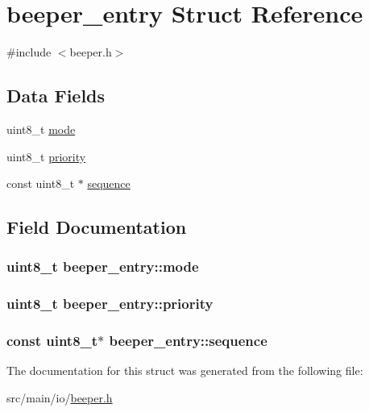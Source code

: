 \hypertarget{structbeeper__entry}{\section{beeper\+\_\+entry Struct Reference}
\label{structbeeper__entry}
}


{\ttfamily \#include $<$beeper.\+h$>$}

\subsection*{Data Fields}
\begin{DoxyCompactItemize}
\item 
uint8\+\_\+t \hyperlink{structbeeper__entry_a740cb9eaead3edd596b8ffcfae78cf38}{mode}
\item 
uint8\+\_\+t \hyperlink{structbeeper__entry_a863a198fa1ebd40f855fcc742ab92fba}{priority}
\item 
const uint8\+\_\+t $\ast$ \hyperlink{structbeeper__entry_a996d7abc7f36cb96a6edc9a1c768a72a}{sequence}
\end{DoxyCompactItemize}


\subsection{Field Documentation}
\hypertarget{structbeeper__entry_a740cb9eaead3edd596b8ffcfae78cf38}{
\subsubsection[{mode}]{\setlength{\rightskip}{0pt plus 5cm}uint8\+\_\+t beeper\+\_\+entry\+::mode}}\label{structbeeper__entry_a740cb9eaead3edd596b8ffcfae78cf38}
\hypertarget{structbeeper__entry_a863a198fa1ebd40f855fcc742ab92fba}{
\subsubsection[{priority}]{\setlength{\rightskip}{0pt plus 5cm}uint8\+\_\+t beeper\+\_\+entry\+::priority}}\label{structbeeper__entry_a863a198fa1ebd40f855fcc742ab92fba}
\hypertarget{structbeeper__entry_a996d7abc7f36cb96a6edc9a1c768a72a}{
\subsubsection[{sequence}]{\setlength{\rightskip}{0pt plus 5cm}const uint8\+\_\+t$\ast$ beeper\+\_\+entry\+::sequence}}\label{structbeeper__entry_a996d7abc7f36cb96a6edc9a1c768a72a}


The documentation for this struct was generated from the following file\+:\begin{DoxyCompactItemize}
\item 
src/main/io/\hyperlink{beeper_8h}{beeper.\+h}\end{DoxyCompactItemize}

